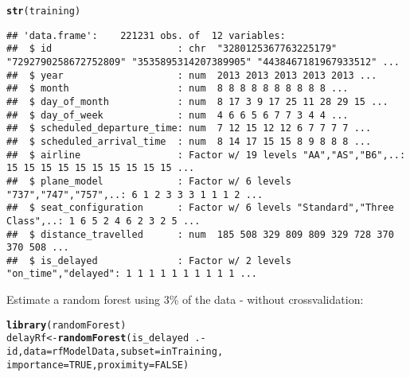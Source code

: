 \documentclass{article}\usepackage[]{graphicx}\usepackage[]{color}
\makeatletter
\newcommand{\hlnum}[1]{\textcolor[rgb]{0.686,0.059,0.569}{#1}}%
\newcommand{\hlopt}[1]{\textcolor[rgb]{0,0,0}{#1}}%
\newcommand{\hlstd}[1]{\textcolor[rgb]{0.345,0.345,0.345}{#1}}%
\newcommand{\hlkwb}[1]{\textcolor[rgb]{0.69,0.353,0.396}{#1}}%
\newcommand{\hlkwc}[1]{\textcolor[rgb]{0.333,0.667,0.333}{#1}}%
\newcommand{\hlkwd}[1]{\textcolor[rgb]{0.737,0.353,0.396}{\textbf{#1}}}%
\newenvironment{kframe}{%
 \def\at@end@of@kframe{}%
 \ifinner\ifhmode%
  \def\at@end@of@kframe{\end{minipage}}%
  \begin{minipage}{\columnwidth}%
 \fi\fi%
 \def\FrameCommand##1{\hskip\@totalleftmargin \hskip-\fboxsep
 \colorbox{shadecolor}{##1}\hskip-\fboxsep
     \hskip-\linewidth \hskip-\@totalleftmargin \hskip\columnwidth}%
 \MakeFramed {\advance\hsize-\width
   \@totalleftmargin\z@ \linewidth\hsize
   \@setminipage}}%
 {\par\unskip\endMakeFramed%
 \at@end@of@kframe}
\newenvironment{knitrout}{}{} %
\makeatother
\begin{document}
\begin{knitrout}
\color{fgcolor}\begin{kframe}
\begin{alltt}
\hlkwd{str}\hlstd{(training)}
\end{alltt}
\begin{verbatim}
## 'data.frame':	221231 obs. of  12 variables:
##  $ id                      : chr  "3280125367763225179" "7292790258672752809" "3535895314207389905" "4438467181967933512" ...
##  $ year                    : num  2013 2013 2013 2013 2013 ...
##  $ month                   : num  8 8 8 8 8 8 8 8 8 8 ...
##  $ day_of_month            : num  8 17 3 9 17 25 11 28 29 15 ...
##  $ day_of_week             : num  4 6 6 5 6 7 7 3 4 4 ...
##  $ scheduled_departure_time: num  7 12 15 12 12 6 7 7 7 7 ...
##  $ scheduled_arrival_time  : num  8 14 17 15 15 8 9 8 8 8 ...
##  $ airline                 : Factor w/ 19 levels "AA","AS","B6",..: 15 15 15 15 15 15 15 15 15 15 ...
##  $ plane_model             : Factor w/ 6 levels "737","747","757",..: 6 1 2 3 3 3 1 1 1 2 ...
##  $ seat_configuration      : Factor w/ 6 levels "Standard","Three Class",..: 1 6 5 2 4 6 2 3 2 5 ...
##  $ distance_travelled      : num  185 508 329 809 809 329 728 370 370 508 ...
##  $ is_delayed              : Factor w/ 2 levels "on_time","delayed": 1 1 1 1 1 1 1 1 1 1 ...
\end{verbatim}
\end{kframe}
\end{knitrout}


Estimate a random forest using 3\% of the data - without crossvalidation:
\begin{knitrout}
\color{fgcolor}\begin{kframe}
\begin{alltt}
\hlkwd{library}\hlstd{(randomForest)}
\hlstd{delayRf} \hlkwb{<-} \hlkwd{randomForest}\hlstd{(is_delayed} \hlopt{~} \hlstd{.} \hlopt{-} \hlstd{id,} \hlkwc{data}\hlstd{=rfModelData,} \hlkwc{subset}\hlstd{=inTraining,}
                        \hlkwc{importance}\hlstd{=}\hlnum{TRUE}\hlstd{,} \hlkwc{proximity}\hlstd{=}\hlnum{FALSE}\hlstd{)}
\end{alltt}
\end{kframe}
\end{knitrout}
\end{document}
